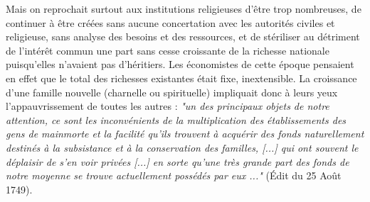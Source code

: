  Mais on reprochait surtout aux institutions religieuses d'être trop nombreuses, de continuer à être créées sans aucune concertation avec les autorités civiles et religieuse, sans analyse des besoins et des ressources, et de stériliser au détriment de l'intérêt commun une part sans cesse croissante de la richesse nationale puisqu'elles n'avaient pas d'héritiers. Les économistes de cette époque pensaient en effet que le total des richesses existantes était fixe, inextensible. La croissance d'une famille nouvelle (charnelle ou spirituelle) impliquait donc à leurs yeux l'appauvrissement de toutes les autres : \emph{"un des principaux objets de notre attention, ce sont les inconvénients de la multiplication des établissements des gens de mainmorte et la facilité qu'ils trouvent à acquérir des fonds naturellement destinés à la subsistance et à la conservation des familles, \emph{[...]} qui ont souvent le déplaisir de s'en voir privées \emph{[...]} en sorte qu'une très grande part des fonds de notre moyenne se trouve actuellement possédés par eux ..."} (Édit du 25 Août 1749). 

